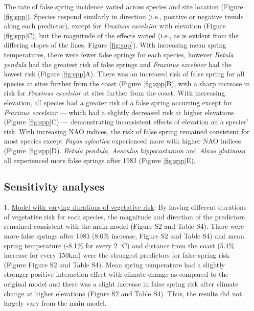 \documentclass{article}\usepackage[]{graphicx}\usepackage[]{color}
\begin{document}
The rate of false spring incidence varied across species and site location (Figure \ref{fig:spp}). Species respond similarly in direction (i.e., positive or negative trends along each predictor), except for \textit{Fraxinus excelsior} with elevation (Figure \ref{fig:spp}C), but the magnitude of the effects varied (i.e., as is evident from the differing slopes of the lines, Figure \ref{fig:spp}). With increasing mean spring temperatures, there were fewer false springs for each species, however \textit{Betula pendula} had the greatest risk of false springs and \textit{Fraxinus excelsior} had the lowest risk (Figure \ref{fig:spp}A). There was an increased risk of false spring for all species at sites further from the coast (Figure \ref{fig:spp}B), with a sharp increase in risk for \textit{Fraxinus excelsior} at sites further from the coast. With increasing elevation, all species had a greater risk of a false spring occurring except for \textit{Fraxinus excelsior} --- which had a slightly decreased risk at higher elevations (Figure \ref{fig:spp}C) --- demonstrating inconsistent effects of elevation on a species' risk.  With increasing NAO indices, the risk of false spring remained consistent for most species except \textit{Fagus sylvatica} experienced more with higher NAO indices (Figure \ref{fig:spp}D). \textit{Betula pendula}, \textit{Aesculus hippocastanum} and \textit{Alnus glutinosa} all experienced more false springs after 1983 (Figure \ref{fig:spp}E). %

\subsection*{Sensitivity analyses}
1. \underline{Model with varying durations of vegetative risk}: By having different durations of vegetative risk for each species, the magnitude and direction of the predictors remained consistent with the main model (Figure S2 and Table S4). There were more false springs after 1983 (8.6\% increase, Figure S2 and Table S4) and mean spring temperature (-8.1\% for every 2 $^\circ$C) and distance from the coast (5.4\% increase for every 150km) were the strongest predictors for false spring risk (Figure Figure S2 and Table S4). Mean spring temperature had a slightly stronger positive interaction effect with climate change as compared to the original model and there was a slight increase in false spring risk after climate change at higher elevations (Figure S2 and Table S4). Thus, the results did not largely vary from the main model. 
\end{document}
